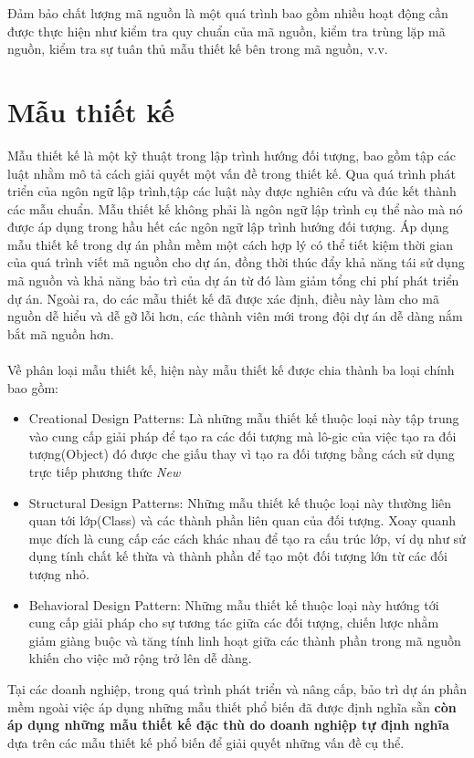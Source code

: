 \documentclass[12pt]{report}
\begin{document}
\noindent Đảm bảo chất lượng mã nguồn là một quá trình bao gồm nhiều hoạt động cần được thực hiện như kiểm tra quy chuẩn của mã nguồn, kiểm tra trùng lặp mã nguồn, kiểm tra sự tuân thủ mẫu thiết kế bên trong mã nguồn, v.v.
\section{Mẫu thiết kế}
Mẫu thiết kế \cite{go4} là một kỹ thuật trong lập trình hướng đối tượng, bao gồm tập các luật nhằm mô tả cách giải quyết một vấn đề trong thiết kế. Qua quá trình phát triển của ngôn ngữ lập trình,tập các luật này được nghiên cứu và đúc kết thành các mẫu chuẩn. Mẫu thiết kế không phải là ngôn ngữ lập trình cụ thể nào mà nó được áp dụng trong hầu hết các ngôn ngữ lập trình hướng đối tượng.
Áp dụng mẫu thiết kế trong dự án phần mềm một cách hợp lý có thể tiết kiệm thời gian của quá trình viết mã nguồn cho dự án, đồng thời thúc đẩy khả năng tái sử dụng mã nguồn và khả năng bảo trì của dự án từ đó làm giảm tổng chi phí phát triển dự án. Ngoài ra, do các mẫu thiết kế đã được xác định, điều này làm cho mã nguồn dễ hiểu và dễ gỡ lỗi hơn, các thành viên mới trong đội dự án dễ dàng nắm bắt mã nguồn hơn.
\\\\
Về phân loại mẫu thiết kế, hiện này mẫu thiết kế được chia thành ba loại chính bao gồm:
\begin{itemize}
	\item Creational Design Patterns: Là những mẫu thiết kế thuộc loại này tập trung vào cung cấp giải pháp để tạo ra các đối tượng mà lô-gic của việc tạo ra đối tượng(Object) đó được che giấu thay vì tạo ra đối tượng bằng cách sử dụng trực tiếp phương thức \textit{New}
	\item Structural Design Patterns: Những mẫu thiết kế thuộc loại này thường liên quan tới lớp(Class) và các thành phần liên quan của đối tượng. Xoay quanh mục đích là cung cấp các cách khác nhau để tạo ra cấu trúc lớp, ví dụ như sử dụng tính chất kế thừa và thành phần để tạo một đối tượng lớn từ các đối tượng nhỏ.
	\item Behavioral Design Pattern: Những mẫu thiết kế thuộc loại này hướng tới cung cấp giải pháp cho sự tương tác giữa các đối tượng, chiến lược nhằm giảm giàng buộc và tăng tính linh hoạt giữa các thành phần trong mã nguồn khiến cho việc mở rộng trở lên dễ dàng.
\end{itemize}
Tại các doanh nghiệp, trong quá trình phát triển và nâng cấp, bảo trì dự án phần mềm ngoài việc áp dụng những mẫu thiết phổ biến đã được định nghĩa sẵn \textbf{còn áp dụng những mẫu thiết kế đặc thù do doanh nghiệp tự định nghĩa } dựa trên các mẫu thiết kế phổ biến để giải quyết những vấn đề cụ thể.
\end{document}
